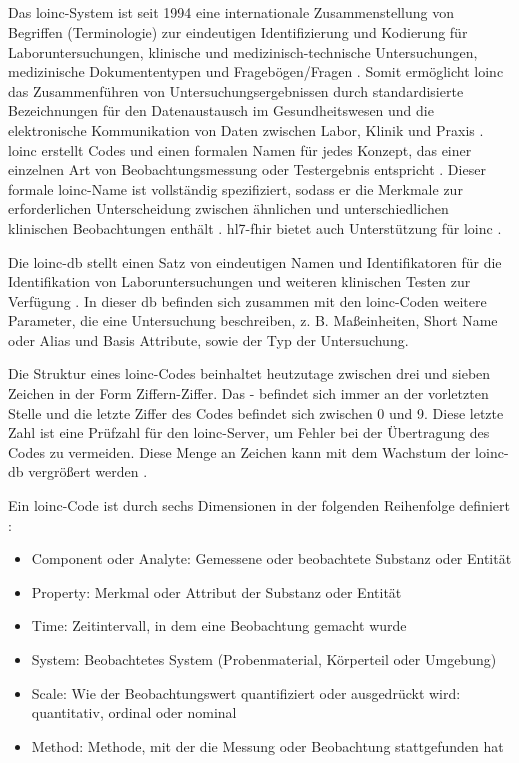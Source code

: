 \subsection{} \label{subsec:loinc}

Das \acf{loinc}-System ist seit 1994 eine internationale Zusammenstellung von Begriffen (Terminologie) zur eindeutigen Identifizierung und Kodierung für Laboruntersuchungen, klinische und medizinisch-technische Untersuchungen, medizinische Dokumententypen und Fragebögen/Fragen \cite{loincbfarm, loincpaper}. Somit ermöglicht \ac{loinc} das Zusammenführen von Untersuchungsergebnissen durch standardisierte Bezeichnungen für den Datenaustausch im Gesundheitswesen und die elektronische Kommunikation von Daten zwischen Labor, Klinik und Praxis \cite{interop}. \ac{loinc} erstellt Codes und einen formalen Namen für jedes Konzept, das einer einzelnen Art von Beobachtungsmessung oder Testergebnis entspricht \cite{interop}. Dieser formale \ac{loinc}-Name ist vollständig spezifiziert, sodass er die Merkmale zur erforderlichen Unterscheidung zwischen ähnlichen und unterschiedlichen klinischen Beobachtungen enthält \cite{telemedizin}. \ac{hl7}-\ac{fhir} bietet auch Unterstützung für \ac{loinc} \cite{loincpaper}.

Die \ac{loinc}-\ac{db} stellt einen Satz von eindeutigen Namen und Identifikatoren für die Identifikation von Laboruntersuchungen und weiteren klinischen Testen zur Verfügung \cite{loincbas}. In dieser \ac{db} befinden sich zusammen mit den \ac{loinc}-Coden weitere Parameter, die eine Untersuchung beschreiben, z. B. Maßeinheiten, \glqq Short Name\grqq{} oder Alias und Basis Attribute, sowie der Typ der Untersuchung.

Die Struktur eines \ac{loinc}-Codes beinhaltet heutzutage zwischen drei und sieben Zeichen in der Form \glqq Ziffern-Ziffer\grqq{}. Das \glqq-\grqq{} befindet sich immer an der vorletzten Stelle und die letzte Ziffer des Codes befindet sich zwischen 0 und 9. Diese letzte Zahl ist eine Prüfzahl für den \ac{loinc}-Server, um Fehler bei der Übertragung des Codes zu vermeiden. Diese Menge an Zeichen kann mit dem Wachstum der \ac{loinc}-\ac{db} vergrößert werden \cite{loincoffi}.

Ein \ac{loinc}-Code ist durch sechs Dimensionen in der folgenden Reihenfolge definiert \cite{loincbfarm}: 
\begin{itemize}
	\item Component oder Analyte: Gemessene oder beobachtete Substanz oder Entität
	\item Property: Merkmal oder Attribut der Substanz oder Entität
	\item Time: Zeitintervall, in dem eine Beobachtung gemacht wurde
	\item System: Beobachtetes System (Probenmaterial, Körperteil oder Umgebung)
	\item Scale: Wie der Beobachtungswert quantifiziert oder ausgedrückt wird: quantitativ, ordinal oder nominal
	\item Method: Methode, mit der die Messung oder Beobachtung stattgefunden hat
\end{itemize}


